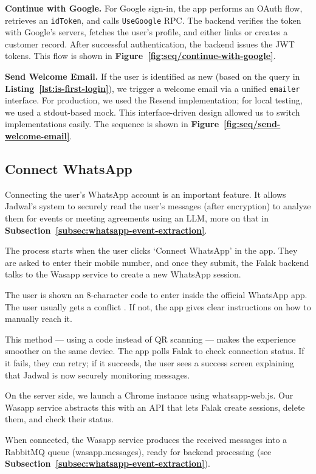 \textbf{Continue with Google.} For Google sign-in, the app performs an OAuth flow, retrieves an \texttt{idToken}, and calls \texttt{UseGoogle} RPC. The backend verifies the token with Google's servers, fetches the user's profile, and either links or creates a customer record. After successful authentication, the backend issues the JWT tokens. This flow is shown in \textbf{Figure~\ref{fig:seq/continue-with-google}}.

\textbf{Send Welcome Email.} If the user is identified as new (based on the query in \textbf{Listing~\ref{lst:is-first-login}}), we trigger a welcome email via a unified \texttt{emailer} interface. For production, we used the Resend implementation; for local testing, we used a stdout-based mock. This interface-driven design allowed us to switch implementations easily. The sequence is shown in \textbf{Figure~\ref{fig:seq/send-welcome-email}}.

\subsection{Connect WhatsApp}

Connecting the user's WhatsApp account is an important feature. It allows Jadwal's system to securely read the user's messages (after encryption) to analyze them for events or meeting agreements using an LLM, more on that in \textbf{Subsection~\ref{subsec:whatsapp-event-extraction}}.

The process starts when the user clicks `Connect WhatsApp' in the app. They are asked to enter their mobile number, and once they submit, the Falak backend talks to the Wasapp service to create a new WhatsApp session.

The user is shown an 8-character code to enter inside the official WhatsApp app. The user usually gets a conflict . If not, the app gives clear instructions on how to manually reach it.

This method — using a code instead of QR scanning — makes the experience smoother on the same device. The app polls Falak to check connection status. If it fails, they can retry; if it succeeds, the user sees a success screen explaining that Jadwal is now securely monitoring messages.

On the server side, we launch a Chrome instance using whatsapp-web.js. Our Wasapp service abstracts this with an API that lets Falak create sessions, delete them, and check their status.

When connected, the Wasapp service produces the received messages into a RabbitMQ queue (wasapp.messages), ready for backend processing (see \textbf{Subsection~\ref{subsec:whatsapp-event-extraction}}).

